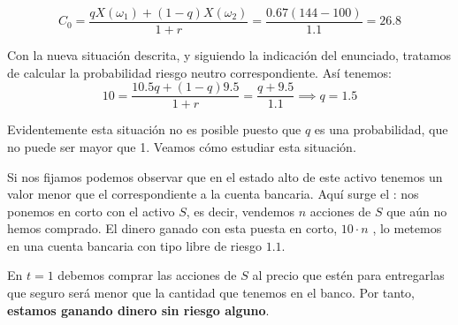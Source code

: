 \begin{problem}[2]
\[C_0 = \frac{qX(ω_1) + (1-q)X(ω_2)}{1+r} = \frac{0.67(144-100)}{1.1} = 26.8\]

\spart

Con la nueva situación descrita, y siguiendo la indicación del enunciado, tratamos de calcular la probabilidad riesgo neutro correspondiente. Así tenemos:
\[10 = \frac{10.5q + (1-q)9.5}{1+r} = \frac{q+9.5}{1.1}\implies q=1.5 \]

Evidentemente esta situación no es posible puesto que $q$ es una probabilidad, que no puede ser mayor que 1. Veamos cómo estudiar esta situación.

Si nos fijamos podemos observar que en el estado alto de este activo tenemos un valor menor que el correspondiente a la cuenta bancaria. Aquí surge el : nos ponemos en corto con el activo $S$, es decir, vendemos $n$ acciones de $S$ que aún no hemos comprado. El dinero ganado con esta puesta en corto, $10\cdot n$ \texteuro, lo metemos en una cuenta bancaria con tipo libre de riesgo $1.1$.

En $t=1$ debemos comprar las acciones de $S$ al precio que estén para entregarlas que seguro será menor que la cantidad que tenemos en el banco. Por tanto, \textbf{estamos ganando dinero sin riesgo alguno}.
\end{problem}

